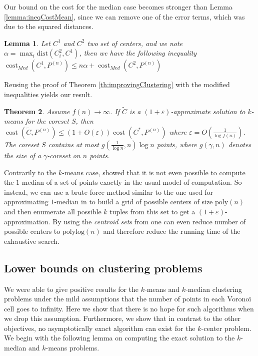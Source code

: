 \documentclass[a4paper,11pt,oneside,english,onecolumn]{article}
\newtheorem{theorem}{Theorem}
\newtheorem{lemma}[theorem]{Lemma}
\theoremstyle{definition}
\newcommand{\dist}[0]{\ensuremath{\mathrm{dist}}}
\DeclareMathOperator{\cost}{cost}
\newcommand{\eps}{\ensuremath{\varepsilon}}
\begin{document}
Our bound on the cost for the median case becomes stronger than Lemma \ref{lemma:ineqCostMean}, since we can remove one of the error terms, which was due to the squared distances.
\begin{lemma}
Let $C^1$ and $C^2$ two set of centers, and we note $\alpha = \max_i \dist(C^2_i, C^1)$, then we have the following inequality $\cost_{Med}(C^1, P^{(n)}) \leq n \alpha + \cost_{Med}(C^2, P^{(n)})$
\end{lemma}
Reusing the proof of Theorem \ref{th:improvingClustering} with the modified inequalities yields our result.

\begin{theorem}
Assume $f(n) \rightarrow \infty$. If $\tilde C$ is a $(1 + \eps)$-approximate solution to $k$-means for the coreset $S$, then $ \cost(\tilde C, P^{(n)}) \leq (1 + O(\eps)) \cost(C^*, P^{(n)})$
where $\eps = O(\frac{1}{\log f(n)})$. The coreset $S$ contains at most $g(\frac{1}{\log n}, n) \log n$ points, where $g(\gamma, n)$ denotes the size of a $\gamma$-coreset on $n$ points.
\end{theorem}

Contrarily to the $k$-means case, \cite{Bajaj} showed that it is not even possible to compute the $1$-median of a set of points exactly in the usual model of computation. So instead, we can use a brute-force method similar to the one used for approximating $1$-median in \cite{oneMedian} to build a grid of possible centers of size $\mathrm{poly}(n)$ and then enumerate all possible $k$ tuples from this set to get a $(1+\eps)$-approximation. By using the \emph{centroid sets} from \cite{HPClustering} one can even reduce number of possible centers to $\mathrm{polylog}(n)$ and therefore reduce the running time of the exhaustive search.



\subsection{Lower bounds on clustering problems}
\label{section:negativeClustering}
We were able to give positive results for the $k$-means and $k$-median clustering problems under the mild assumptions that the number of points in each Vorono\"i cell goes to infinity. Here we show that there is no hope for such algorithms when we drop this assumption. Furthermore, we show that in contrast to the other objectives, no asymptotically exact algorithm can exist for the $k$-center problem. We begin with the following lemma on computing the exact solution to the $k$-median and $k$-means problems.
\end{document}
